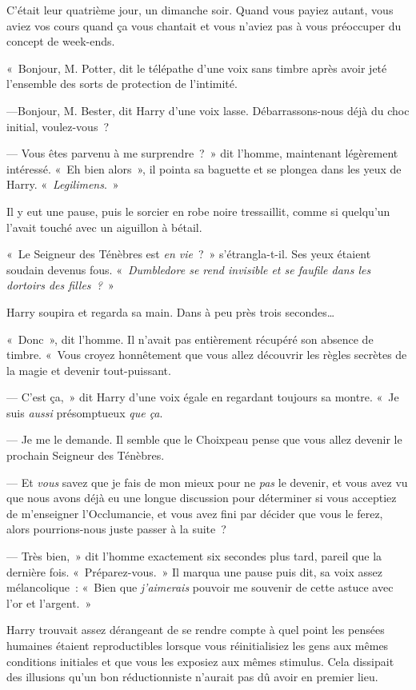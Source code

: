 C'était leur quatrième jour, un dimanche soir.
Quand vous payiez autant, vous aviez vos cours quand ça vous chantait et vous n'aviez pas à vous préoccuper du concept de week-ends.

«~Bonjour, M. Potter, dit le télépathe d'une voix sans timbre après avoir jeté l'ensemble des sorts de protection de l'intimité.

---Bonjour, M. Bester, dit Harry d'une voix lasse.
Débarrassons-nous déjà du choc initial, voulez-vous~?

--- Vous êtes parvenu à me surprendre~?~»
dit l'homme, maintenant légèrement intéressé.
«~Eh bien alors~», il pointa sa baguette et se plongea dans les yeux de Harry.
«~\emph{Legilimens}.~»

Il y eut une pause, puis le sorcier en robe noire tressaillit, comme si quelqu'un l'avait touché avec un aiguillon à bétail.

«~Le Seigneur des Ténèbres est \emph{en vie}~?~»
s'étrangla-t-il.
Ses yeux étaient soudain devenus fous.
«~\emph{Dumbledore se rend invisible et se faufile dans les dortoirs des filles~?}~»

Harry soupira et regarda sa main.
Dans à peu près trois secondes…

«~Donc~», dit l'homme.
Il n'avait pas entièrement récupéré son absence de timbre.
«~Vous croyez honnêtement que vous allez découvrir les règles secrètes de la magie et devenir tout-puissant.

--- C'est ça,~» dit Harry d'une voix égale en regardant toujours sa montre.
«~Je suis \emph{aussi} présomptueux \emph{que ça}.

--- Je me le demande.
Il semble que le Choixpeau pense que vous allez devenir le prochain Seigneur des Ténèbres.

--- Et \emph{vous} savez que je fais de mon mieux pour ne \emph{pas} le devenir, et vous avez vu que nous avons déjà eu une longue discussion pour déterminer si vous acceptiez de m'enseigner l'Occlumancie, et vous avez fini par décider que vous le ferez, alors pourrions-nous juste passer à la suite~?

--- Très bien,~» dit l'homme exactement six secondes plus tard, pareil que la dernière fois.
«~Préparez-vous.~»
Il marqua une pause puis dit, sa voix assez mélancolique~: «~Bien que \emph{j'aimerais} pouvoir me souvenir de cette astuce avec l'or et l'argent.~»

Harry trouvait assez dérangeant de se rendre compte à quel point les pensées humaines étaient reproductibles lorsque vous réinitialisiez les gens aux mêmes conditions initiales et que vous les exposiez aux mêmes stimulus.
Cela dissipait des illusions qu'un bon réductionniste n'aurait pas dû avoir en premier lieu.

